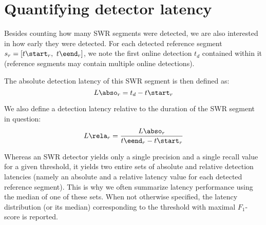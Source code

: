 



\section{Quantifying detector latency}

Besides counting how many SWR segments were detected, we are also interested in how early they were detected. For each detected reference segment $s_r = [ t\start_r,\ t\eend_r ]$, we note the first online detection $t_d$ contained within it (reference segments may contain multiple online detections).

The absolute detection latency of this SWR segment is then defined as:
\begin{equation}
L\abso_r = t_d - t\start_r 
\end{equation}

We also define a detection latency relative to the duration of the SWR segment in question:
\begin{equation}
L\rela_r = \frac{L\abso_r}{t\eend_r - t\start_r} 
\end{equation}

Whereas an SWR detector yields only a single precision and a single recall value for a given threshold, it yields two entire sets of absolute and relative detection latencies (namely an absolute and a relative latency value for each detected reference segment). This is why we often summarize latency performance using the median of one of these sets. When not otherwise specified, the latency distribution (or its median) corresponding to the threshold with maximal $F_1$-score is reported.
